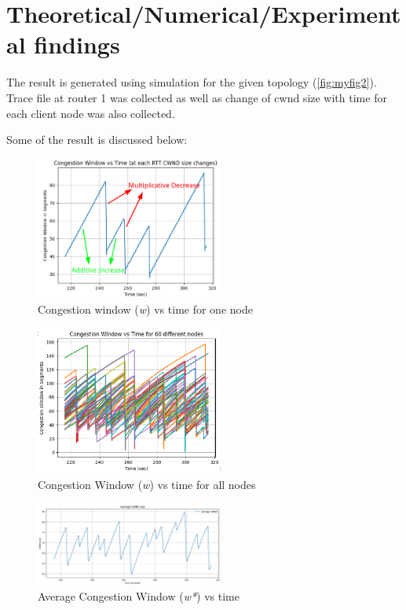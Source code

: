 \clearpage
\section{Theoretical/Numerical/Experimental findings}
The result is generated using simulation for the given topology (\ref{fig:myfig2}). Trace file at router 1 was collected as well as change of cwnd size with time for each client node was also collected. 

Some of the result is discussed below:\\
\begin{figure}[h]
    \centering
    \includegraphics[width=0.55\textwidth]{aimd.png}
    \caption{\label{fig:myfig3} Congestion window (\textit{w}) vs time for one node}
\end{figure}
\begin{figure}[h]
    \centering
    \includegraphics[width=0.55\textwidth]{allNodesCwnd.png}
    \caption{\label{fig:myfig4} Congestion Window (\textit{w}) vs time for all nodes}
\end{figure}
\begin{figure}[h]
    \centering
    \includegraphics[width=0.55\textwidth]{avgCwnd.png}
    \caption{\label{fig:myfig5} Average Congestion Window (\textit{w*}) vs time }
\end{figure}
